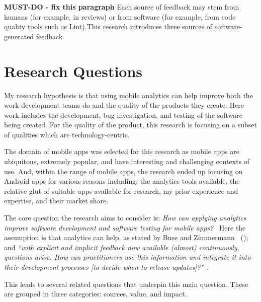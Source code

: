 \textbf{MUST-DO - fix this paragraph} Each source of feedback may stem from humans (for example, in reviews) or from software (for example, from code quality tools such as Lint).This research introduces three sources of software-generated feedback.


\section{Research Questions}
\label{section-research-questions}

My research hypothesis is that using mobile analytics can help improve both the work development teams do and the quality of the products they create. Here work includes the development, bug investigation, and testing of the software being created. For the quality of the product, this research is focusing on a subset of qualities which are technology-centric.

The domain of mobile apps was selected for this research as mobile apps are ubiquitous, extremely popular, and have interesting and challenging contexts of use. And, within the range of mobile apps, the research ended up focusing on Android apps for various reasons including: the analytics tools available, the relative glut of suitable apps available for research, my prior experience and expertise, and their market share.

The core question the research aims to consider is: 
\emph{How can applying analytics improve software development and software testing for mobile apps?}~\label{overall-research-question}
Here the assumption is that analytics can help, as stated by Buse and Zimmermann ~(\citeyear{buse_analytics_2010}); and \emph{``with explicit and implicit feedback now available (almost) continuously, questions arise. How can practitioners use this information and integrate it into their development processes [to decide when to release updates]?"}~\citep{maalej2016_towards_data_driven_requirements_engineering}.

This leads to several related questions that underpin this main question. These are grouped in three categories: sources, value, and impact.






